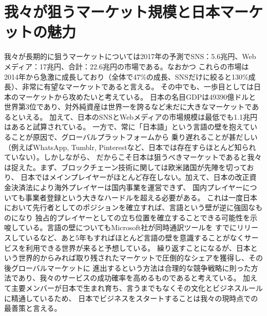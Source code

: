 \documentclass{jsarticle}
\begin{document}
\section{我々が狙うマーケット規模と日本マーケットの魅力}
我々が長期的に狙うマーケットについては2017年の予測でSNS：5.6兆円、Webメディア：17兆円、合計：22.6兆円の市場である。なおかつ
これらの市場は2014年から急激に成長しており（全体で47\%の成長、SNSだけに絞ると130\%成長）、非常に有望なマーケットであると言える。
その中でも、一歩目としては日本のマーケットから攻めたいと考えている。
日本の名目GDPは49390億ドルと世界第3位であり、対外純資産は世界一を誇るなど未だに大きなマーケットであるといえる。
加えて、日本のSNSとWebメディアの市場規模は最低でも1.1兆円はあると試算されている。
一方で、常に「日本語」という言語の壁を抱えていることが原因で、グローバルプラットフォームから
乗り遅れることが甚だしい（例えばWhatsApp, Tumblr, Pinterestなど、日本では存在すらほとんど知られていない）。しかしながら、
だからこそ日本は狙うべきマーケットであると我々は捉えた。まず、ブロックチェーン技術に関しては欧米諸国が先陣を切っており、
日本ではメインプレイヤーがほとんど存在しない。加えて、日本の改正資金決済法により海外プレイヤーは国内事業を運営できず、
国内プレイヤーについても事業者登録という大きなハードルを超える必要がある。
これは一度日本において先行者としてのポジションを確立すれば、言語という壁が逆に強固なものになり
独占的プレイヤーとしての立ち位置を確立することできる可能性を示唆している。言語の壁についてもMicrosoft社が同時通訳ツールを
すでにリリースしているなど、あと5年もすればほとんど言語の壁を意識することがなくサービスを利用できる世界が来ると予想している。
繰り返すことになるが、日本という世界的からみれば取り残されたマーケットで圧倒的なシェアを獲得し、その後グローバルマーケットに
進出するという方法は合理的な競争戦略に則った方法であり、我々のサービスの成功確率を高めるものであると考えている。
加えて主要メンバーが日本で生まれ育ち、言うまでもなくその文化とビジネスルールに精通しているため、
日本でビジネスをスタートすることは我々の現時点での最善策と言える。
\end{document}
